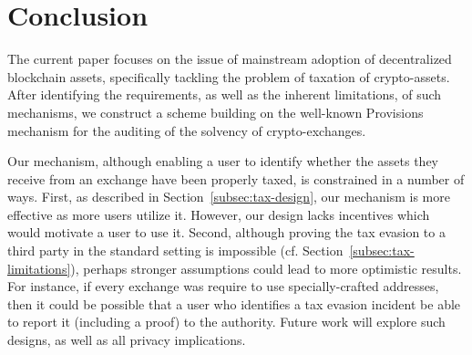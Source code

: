 \section{Conclusion}\label{sec:conclusion}

The current paper focuses on the issue of mainstream adoption of decentralized
blockchain assets, specifically tackling the problem of taxation of
crypto-assets. After identifying the requirements, as well as the inherent
limitations, of such mechanisms, we construct a scheme building on the
well-known Provisions mechanism for the auditing of the solvency of
crypto-exchanges.

Our mechanism, although enabling a user to identify whether the assets they
receive from an exchange have been properly taxed, is constrained in a number
of ways. First, as described in Section~\ref{subsec:tax-design}, our mechanism
is more effective as more users utilize it. However, our design lacks
incentives which would motivate a user to use it. Second, although proving the
tax evasion to a third party in the standard setting is impossible (cf.
Section~\ref{subsec:tax-limitations}), perhaps stronger assumptions could lead
to more optimistic results. For instance, if every exchange was require to use
specially-crafted addresses, then it could be possible that a user who
identifies a tax evasion incident be able to report it (including a proof) to
the authority. Future work will explore such designs, as well as all privacy
implications.
